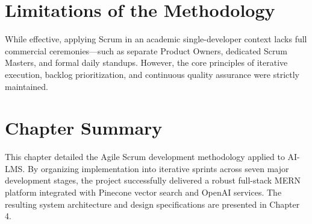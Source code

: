 \section{Limitations of the Methodology}

While effective, applying Scrum in an academic single-developer context lacks full commercial ceremonies—such as separate Product Owners, dedicated Scrum Masters, and formal daily standups. However, the core principles of iterative execution, backlog prioritization, and continuous quality assurance were strictly maintained.

\section{Chapter Summary}

This chapter detailed the Agile Scrum development methodology applied to AI-LMS. By organizing implementation into iterative sprints across seven major development stages, the project successfully delivered a robust full-stack MERN platform integrated with Pinecone vector search and OpenAI services. The resulting system architecture and design specifications are presented in Chapter 4.

